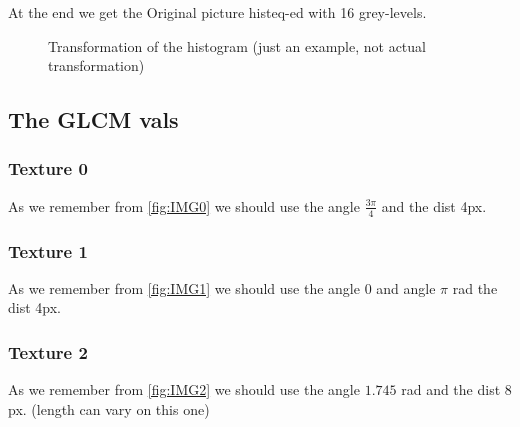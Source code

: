 \documentclass{article}
\begin{document}
At the end we get the Original picture histeq-ed with 16 grey-levels. 

\begin{figure}[h]%
	\centering
    \qquad
    \caption{Transformation of the histogram (just an example, not actual transformation)}%
    \label{fig:Transform}%
\end{figure}


\newpage
\subsection{The GLCM vals}
	\setcounter{subsubsection}{-1}	
	\subsubsection{Texture 0}
		As we remember from \ref{fig:IMG0} we should use the angle $\frac{3\pi}{4}$ and the dist 4px.\\
	\subsubsection{Texture 1}
		As we remember from \ref{fig:IMG1} we should use the angle 0 and angle $\pi$ rad the dist 4px.\\
	\subsubsection{Texture 2}
		As we remember from \ref{fig:IMG2} we should use the angle $1.745$ rad and the dist 8 px. (length can vary on this one)\\
\end{document}
